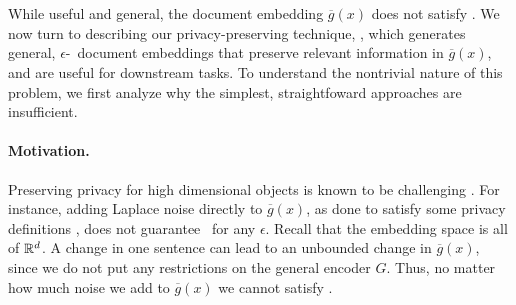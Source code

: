 \section{\technique}
\label{sec:deepcandidate}
While useful and general, the document embedding $\overline{g}(x)$ does not satisfy \SDP. We now turn to describing our privacy-preserving technique, \technique, which generates general, $\epsilon$-\SDP~document embeddings that preserve relevant information in $\overline{g}(x)$, and are useful for downstream tasks. To understand the nontrivial nature of this problem, we first analyze why the simplest, straightfoward approaches are insufficient. 




\paragraph{Motivation.}
  Preserving privacy for high dimensional objects is known to be challenging \cite{kamath_high_dim, mdp_low_dim, DP_compression} . For instance, adding Laplace noise directly to $\overline{g}(x)$, as done to satisfy some privacy definitions \cite{metricdp, orig_metricdp}, does not guarantee \SDP~for any $\epsilon$. Recall that the embedding space is all of ${\mathbb R}^d$. A change in one sentence can lead to an unbounded change in $\overline{g}(x)$, since we do not put any restrictions on the general encoder $G$. Thus, no matter how much noise we add to $\overline{g}(x)$ we cannot satisfy \SDP. 


